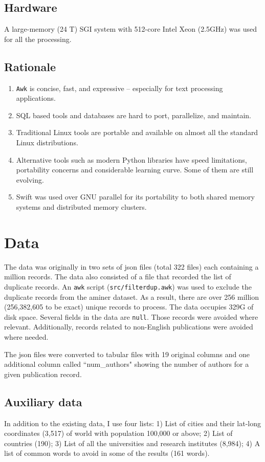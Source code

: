 \documentclass{article}
\begin{document}
\subsection*{Hardware}
A large-memory (24 T) SGI system with 512-core Intel Xeon (2.5GHz) was used for
all the processing.

\subsection*{Rationale}
\begin{enumerate}
\item \texttt{Awk} is concise, fast, and expressive -- especially for text processing applications.
\item SQL based tools and databases are hard to port, parallelize, and maintain.
\item Traditional Linux tools are portable and available on almost all the standard Linux distributions.
\item Alternative tools such as modern Python libraries have speed limitations, portability concerns and considerable learning curve. Some of them are still evolving.
\item Swift was used over GNU parallel for its portability to both shared memory systems and distributed memory clusters.
\end{enumerate}

\section*{Data}
The data was originally in two sets of json files (total 322 files) each
containing a million records. The data also consisted of a file that recorded
the list of duplicate records. An \texttt{awk} script
(\texttt{src/filterdup.awk}) was used to exclude the duplicate records from the
aminer dataset. As a result, there are over 256 million (256,382,605 to be
exact) unique records to process. The data occupies 329G of disk space. Several
fields in the data are \texttt{null}. Those records were avoided where
relevant. Additionally, records related to non-English publications were
avoided where needed.

The json files were converted to tabular files with 19 original columns and one
additional column called ``num\_authors" showing the number of authors for a given
publication record.

\subsection*{Auxiliary data}
In addition to the existing data, I use four lists: 1) List of cities and their
lat-long coordinates (3,517) of world with population 100,000 or above; 2) List
of countries (190); 3) List of all the universities and research institutes
(8,984); 4) A list of common words to avoid in some of the results (161 words).
\end{document}
